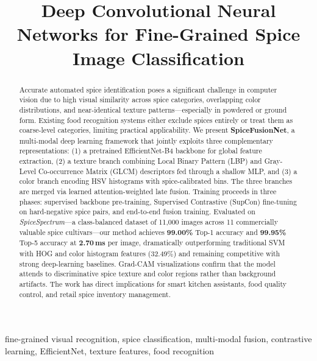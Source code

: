 \documentclass[conference]{IEEEtran}
\begin{document}
\title{Deep Convolutional Neural Networks for Fine-Grained Spice Image Classification}

\author{
}

\maketitle

\begin{abstract}
Accurate automated spice identification poses a significant challenge in computer
vision due to high visual similarity across spice categories, overlapping color
distributions, and near-identical texture patterns—especially in powdered or ground
form. Existing food recognition systems either exclude spices entirely or treat them
as coarse-level categories, limiting practical applicability. We present
\textbf{SpiceFusionNet}, a multi-modal deep learning framework that jointly exploits
three complementary representations: (1) a pretrained EfficientNet-B4 backbone for
global feature extraction, (2) a texture branch combining Local Binary Pattern (LBP)
and Gray-Level Co-occurrence Matrix (GLCM) descriptors fed through a shallow MLP,
and (3) a color branch encoding HSV histograms with spice-calibrated bins. The three
branches are merged via learned attention-weighted late fusion. Training proceeds in
three phases: supervised backbone pre-training, Supervised Contrastive (SupCon)
fine-tuning on hard-negative spice pairs, and end-to-end fusion training. Evaluated
on \textit{SpiceSpectrum}—a class-balanced dataset of 11,000 images across 11
commercially valuable spice cultivars—our method achieves \textbf{99.00\%} Top-1
accuracy and \textbf{99.95\%} Top-5 accuracy at \textbf{2.70\,ms} per image,
dramatically outperforming traditional SVM with HOG and color histogram features
(32.49\%) and remaining competitive with strong deep-learning baselines. Grad-CAM
visualizations confirm that the model attends to discriminative spice texture and
color regions rather than background artifacts. The work has direct implications for
smart kitchen assistants, food quality control, and retail spice inventory management.
\end{abstract}

\begin{IEEEkeywords}
fine-grained visual recognition, spice classification, multi-modal fusion,
contrastive learning, EfficientNet, texture features, food recognition
\end{IEEEkeywords}
\end{document}
